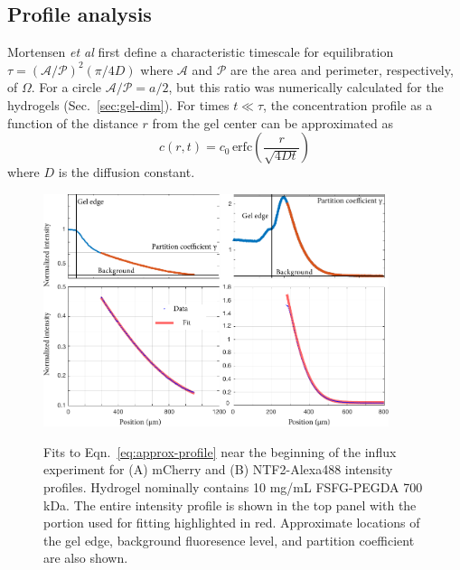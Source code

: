 \subsection{Profile analysis}
\label{sec:profile-analysis}

Mortensen \textit{et al} first define a characteristic timescale for equilibration $\tau = (\mathcal{A}/\mathcal{P})^2 (\pi/4D)$ where $\mathcal{A}$ and $\mathcal{P}$ are the area and perimeter, respectively, of $\Omega$.  For a circle $\mathcal{A}/\mathcal{P} = a/2$, but this ratio was numerically calculated for the hydrogels (Sec.~\ref{sec:gel-dim}).  For times $t \ll \tau$, the concentration profile as a function of the distance $r$ from the gel center can be approximated as 
\begin{equation}
c(r,t) = c_0 \,\mathrm{erfc}\left(\frac{r}{\sqrt{4Dt}}\right)
\label{eq:approx-profile}
\end{equation}
where $D$ is the diffusion constant.


\begin{figure}
\caption[Fits to concentration profiles at a fixed time.]{Fits to Eqn.~\ref{eq:approx-profile} near the beginning of the influx experiment for (A) mCherry and (B) NTF2-Alexa488 intensity profiles.  Hydrogel nominally contains 10 mg/mL FSFG-PEGDA 700 kDa.  The entire intensity profile is shown in the top panel with the portion used for fitting highlighted in red.  Approximate locations of the gel edge, background fluoresence level, and partition coefficient are also shown.}
\centering
\includegraphics[width=0.9\textwidth]{figs/ch04/erfc-position.pdf}
\label{fig:erfc-position}
\end{figure} 

